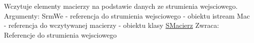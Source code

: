 Wczytuje elementy macierzy na podstawie danych ze strumienia wejsciowego. Argumenty\+: Srm\+We -\/ referencja do strumienia wejsciowego -\/ obiektu istream Mac -\/ referencja do wczytywanej macierzy -\/ obiektu klasy \hyperlink{classSMacierz}{S\+Macierz} Zwraca\+: Referencje do strumienia wejsciowego 